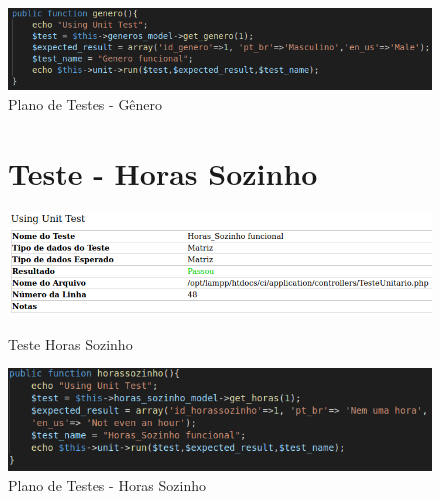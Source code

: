 \begin{apendicesenv}
\begin{figure}[htb]
    \centering
    \caption{\label{fig_timeline}Plano de Testes - Gênero}
	\includegraphics[width=1\textwidth]{imagens/cod_teste_genero.png}
\end{figure}

\begin{figure}[!htbp]
\begin{flushleft}
    \section{Teste - Horas Sozinho}
\end{flushleft}
    \centering
    \caption{Teste Horas Sozinho}
    \includegraphics[width=1\textwidth,pagecommand=\chapter{}]{imagens/teste_horassozinho.png}
    \label{teste-horas-so}
\end{figure}

\begin{figure}[htb]
    \centering
    \caption{\label{fig_timeline}Plano de Testes - Horas Sozinho}
	\includegraphics[width=1\textwidth]{imagens/cod_teste_horassozinho.png}
\end{figure}

\begin{figure}[!htbp]
\begin{flushleft}

\end{flushleft}
\end{figure}
\end{apendicesenv}
